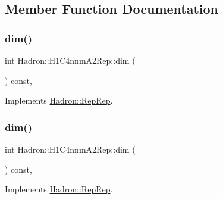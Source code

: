 \subsection{Member Function Documentation}
\mbox{\label{structHadron_1_1H1C4nnmA2Rep_a46f9e7081419a5ffdc3caad2390b5900}} 
\subsubsection{\texorpdfstring{dim()}{dim()}\hspace{0.1cm}{\footnotesize\ttfamily [1/5]}}
{\footnotesize\ttfamily int Hadron\+::\+H1\+C4nnm\+A2\+Rep\+::dim (\begin{DoxyParamCaption}{ }\end{DoxyParamCaption}) const\hspace{0.3cm}{\ttfamily [inline]}, {\ttfamily [virtual]}}



Implements \mbox{\hyperlink{structHadron_1_1RepRep_a92c8802e5ed7afd7da43ccfd5b7cd92b}{Hadron\+::\+Rep\+Rep}}.

\mbox{\label{structHadron_1_1H1C4nnmA2Rep_a46f9e7081419a5ffdc3caad2390b5900}} 
\subsubsection{\texorpdfstring{dim()}{dim()}\hspace{0.1cm}{\footnotesize\ttfamily [2/5]}}
{\footnotesize\ttfamily int Hadron\+::\+H1\+C4nnm\+A2\+Rep\+::dim (\begin{DoxyParamCaption}{ }\end{DoxyParamCaption}) const\hspace{0.3cm}{\ttfamily [inline]}, {\ttfamily [virtual]}}



Implements \mbox{\hyperlink{structHadron_1_1RepRep_a92c8802e5ed7afd7da43ccfd5b7cd92b}{Hadron\+::\+Rep\+Rep}}.

\mbox{\label{structHadron_1_1H1C4nnmA2Rep_a46f9e7081419a5ffdc3caad2390b5900}} 
